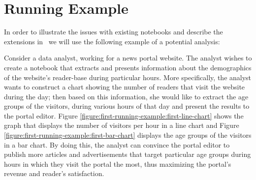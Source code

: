 
\section{Running Example}

In order to illustrate the issues with existing notebooks and describe the extensions in \projname\, we will use the following example of a potential analysis:

\begin{example}
Consider a data analyst, working for a news portal website. The analyst wishes to create a notebook that extracts and presents information about the demographics of the website's reader-base during particular hours. More specifically, the analyst wants to construct a chart showing the number of readers that visit the website during the day; then based on this information, she would like to extract the age groups of the visitors, during various hours of that day and present the results to the portal editor. Figure \ref{figure:first-running-example:first-line-chart} shows the graph that displays the number of visitors per hour in a line chart and Figure \ref{figure:first-running-example:first-bar-chart} displays the age groups of the visitors in a bar chart. By doing this, the analyst can convince the portal editor to publish more articles and advertisements that target particular age groups during hours in which they visit the portal the most, thus maximizing the portal's revenue and reader's satisfaction.
\end{example}

